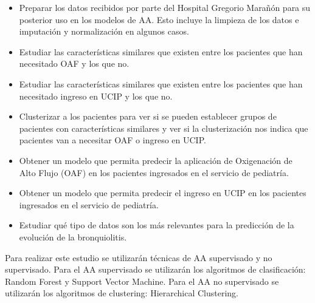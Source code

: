 \begin{itemize}
    \item Preparar los datos recibidos por parte del Hospital Gregorio Marañón para su posterior uso en los modelos de AA. Esto incluye la limpieza de los datos e imputación y normalización en algunos casos. 
    \item Estudiar las características similares que existen entre los pacientes que han necesitado OAF y los que no.
    \item Estudiar las características similares que existen entre los pacientes que han necesitado ingreso en UCIP y los que no.
    \item Clusterizar a los pacientes para ver si se pueden establecer grupos de pacientes con características similares y ver si la clusterización nos indica que pacientes van a necesitar OAF o ingreso en UCIP.
    \item Obtener un modelo que permita predecir la aplicación de Oxigenación de Alto Flujo (OAF) en los pacientes ingresados en el servicio de pediatría.
    \item Obtener un modelo que permita predecir el ingreso en UCIP en los pacientes ingresados en el servicio de pediatría.
    \item Estudiar qué tipo de datos son los más relevantes para la predicción de la evolución de la bronquiolitis.
\end{itemize}


Para realizar este estudio se utilizarán técnicas de AA supervisado y no supervisado. Para el AA supervisado se utilizarán los algoritmos de clasificación: Random Forest y Support Vector Machine. Para el AA no supervisado se utilizarán los algoritmos de clustering: Hierarchical Clustering.

